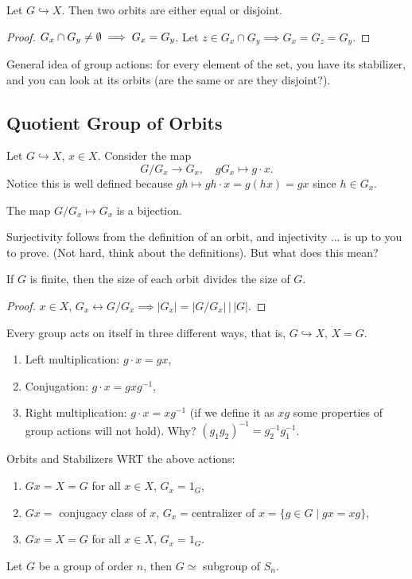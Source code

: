 \begin{lemma}
    Let $G \hookrightarrow X$. Then two orbits are either equal or disjoint.
\end{lemma}
\begin{proof}
    $G_x \cap G_y \neq \emptyset \implies  G_x=G_y$. Let $z\in G_x \cap G_y \implies G_x=G_z=G_y$.
\end{proof}
General idea of group actions: for every element of the set, you have its stabilizer, and you can look at its orbits (are the same or are they disjoint?).

\subsection{Quotient Group of Orbits}
Let $G \hookrightarrow X$, $x\in X$. Consider the map \[
G/G_x \to G_x, \quad gG_x \mapsto g\cdot x.
\]
Notice this is well defined because $gh \mapsto gh\cdot x = g(hx)=gx$ since $h\in G_x$.

\begin{claim}
    The map $G/G_x \mapsto G_x$ is a bijection.
\end{claim}
Surjectivity follows from the definition of an orbit, and injectivity ... is up to you to prove. (Not hard, think about the definitions). But what does this mean?
\begin{prop}
    If $G$ is finite, then the size of each orbit divides the size of $G$. 
\end{prop}
\begin{proof}
    $x\in X$, $G_x \leftrightarrow G/G_x \implies |G_x|=|G/G_x| \, \big| \, |G|$.
\end{proof}
\begin{example}
    Every group acts on itself in three different ways, that is, $G \hookrightarrow X, \, X=G$.
    \begin{enumerate}
        \item Left multiplication: $g\cdot x=gx$,
        \item Conjugation: $g\cdot x=gxg^{-1}$,
        \item Right multiplication: $g\cdot x=xg^{-1}$ (if we define it as $xg$ some properties of group actions will not hold). Why? $(g_1g_2)^{-1}=g_2^{-1}g_1^{-1}$.
    \end{enumerate}
    Orbits and Stabilizers WRT the above actions: 
    \begin{enumerate}
        \item $Gx=X=G$ for all $x\in X$, $G_x={1_G}$,
        \item  $Gx=$ conjugacy class of $x$, $G_x=$centralizer of $x = \{g\in G \mid gx=xg\} $,
        \item $Gx=X=G$ for all $x\in X$, $G_x={1_G}.$
    \end{enumerate}
\end{example}
\begin{prop}
    Let $G$ be a group of order $n$, then $G \simeq $ subgroup of $S_n$.
\end{prop}
